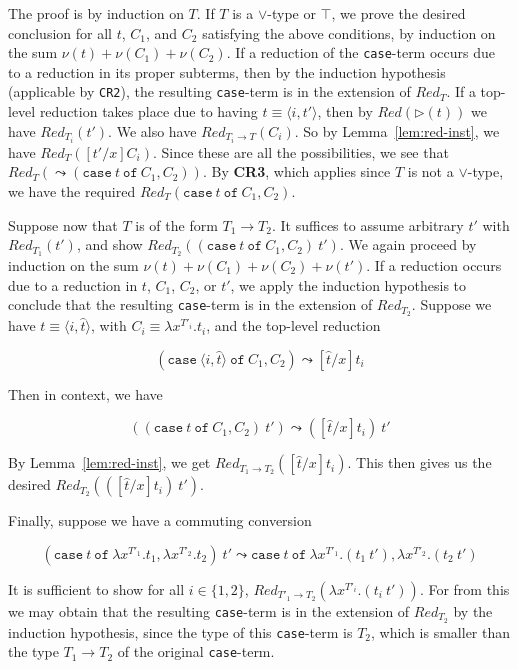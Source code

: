\documentclass{article}
\newcommand{\red}[0]{\textit{Red}}
\newcommand{\redsub}[1]{\textit{Red}(\rhd(#1))}
\begin{document}
\noindent The proof is by induction on $T$.  If $T$ is a $\vee$-type
or $\top$, we prove the desired conclusion for all $t$, $C_1$, and
$C_2$ satisfying the above conditions, by induction on the sum
$\nu(t)+\nu(C_1)+\nu(C_2)$.  If a reduction of the \texttt{case}-term
occurs due to a reduction in its proper subterms, then by the
induction hypothesis (applicable by \texttt{CR2}), the resulting
\texttt{case}-term is in the extension of $\red_{T}$.  If a top-level
reduction takes place due to having $t\equiv \langle i, t'\rangle$,
then by $\redsub{t}$ we have $\red_{T_i}(t')$.  We also have
$\red_{T_i\to T}(C_i)$.  So by Lemma~\ref{lem:red-inst}, we have
$\red_T([t'/x]C_i)$.  Since these are all the possibilities, we see
that $\red_{T}(\leadsto(\texttt{case}\ t\ \texttt{of}\ C_1,C_2))$.  By
\textbf{CR3}, which applies since $T$ is not a $\vee$-type, we have
the required $\red_{T}(\texttt{case}\ t\ \texttt{of}\ C_1,C_2)$.

Suppose now that $T$ is of the form $T_1\to T_2$.  It suffices to
assume arbitrary $t'$ with $\red_{T_1}(t')$, and show
$\red_{T_2}((\texttt{case}\ t\ \texttt{of}\ C_1,C_2)\ t')$.  We again
proceed by induction on the sum $\nu(t)+\nu(C_1)+\nu(C_2)+\nu(t')$.
If a reduction occurs due to a reduction in $t$, $C_1$, $C_2$, or
$t'$, we apply the induction hypothesis to conclude that the resulting
\texttt{case}-term is in the extension of $\red_{T_2}$.  Suppose we have
$t\equiv \langle i, \hat{t}\rangle$, with $C_i\equiv \lambda
x^{T'_i}.t_i$, and the top-level reduction

\[
(\texttt{case}\ \langle i, \hat{t} \rangle\ \texttt{of}\ C_1,C_2)\leadsto [\hat{t}/x]t_i
\]

\noindent Then in context, we have 

\[ ((\texttt{case}\ t\ \texttt{of}\ C_1,C_2)\ t') \leadsto ([\hat{t}/x]t_i)\ t'
\]

\noindent By Lemma~\ref{lem:red-inst}, we get $\red_{T_1\to T_2}([\hat{t}/x]t_i)$.
This then gives us the desired  $\red_{T_2}(([\hat{t}/x]t_i)\ t')$.

Finally, suppose we have a commuting conversion

\[
(\texttt{case}\ t\ \texttt{of}\ \lambda x^{T'_1}.t_1,\lambda x^{T'_2}.t_2)\ t' \leadsto 
  \texttt{case}\ t\ \texttt{of}\ \lambda x^{T'_1}.(t_1\ t'), \lambda x^{T'_2}.(t_2\ t') 
\]

\noindent It is sufficient to show for all $i\in\{1,2\}$, $\red_{T'_1
\to T_2}(\lambda x^{T'_i}.(t_i\ t'))$.  For from this we may obtain
that the resulting \texttt{case}-term is in the extension of
$\red_{T_2}$ by the induction hypothesis, since the type of this
\texttt{case}-term is $T_2$, which is smaller than the type $T_1\to
T_2$ of the original \texttt{case}-term.







\end{document}
